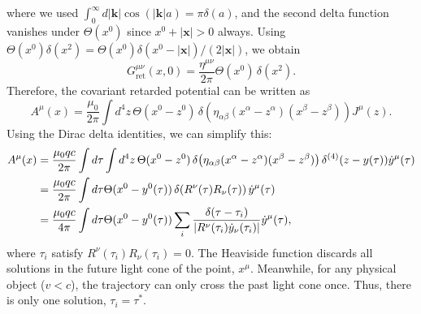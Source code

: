 where we used $\int_0^\infty d|\mathbf{k}|\cos(|\mathbf{k}|a) = \pi\delta(a)$, and the second delta function vanishes under $\Theta(x^0)$ since $x^0 + |\mathbf{x}| > 0$ always. Using $\Theta(x^0)\delta(x^2) = \Theta(x^0)\delta(x^0-|\mathbf{x}|)/(2|\mathbf{x}|)$, we obtain
\begin{equation}
    \boxed{G^{\mu\nu}_{\mathrm{ret}}(x,0) = \frac{\eta^{\mu\nu}}{2\pi}\Theta(x^0)\,\delta(x^2).}
\end{equation}
Therefore, the covariant retarded potential can be written as
\begin{equation}
    A^\mu(x) =\frac{\mu_0}{2\pi}\int d^4z\,
     \Theta(x^0-z^0)\,\delta\!\left(\eta_{\alpha\beta}
     (x^\alpha-z^\alpha)(x^\beta-z^\beta)\right)J^\mu(z).
\end{equation}
Using the Dirac delta identities, we can simplify this:
\begin{align}
        A^\mu(x) &= \frac{\mu_0qc}{2\pi}\int d\tau\int d^4z\,
     \Theta(x^0-z^0)\,\delta\!\left(\eta_{\alpha\beta}
     (x^\alpha-z^\alpha)(x^\beta-z^\beta)\right)\delta^{(4)}(z-y(\tau))\dot{y}^\mu(\tau) \notag \\
     &=\frac{\mu_0qc}{2\pi}\int d\tau
     \Theta(x^0-y^0(\tau))\,\delta\!\left(R^\nu(\tau)R_\nu(\tau)\right)\dot{y}^\mu(\tau) \notag\\
     &=\frac{\mu_0qc}{4\pi}\int d\tau
     \Theta(x^0-y^0(\tau))\sum_i\frac{\delta(\tau-\tau_i)}{|R^\nu(\tau_i)\dot{y}_\nu(\tau_i)|}\dot{y}^\mu(\tau),
\end{align}
where $\tau_i$ satisfy $R^\nu(\tau_i)R_\nu(\tau_i) = 0$. The Heaviside function discards all solutions in the future light cone of the point, $x^\mu$. Meanwhile, for any physical object ($v<c$), the trajectory can only cross the past light cone once. Thus, there is only one solution, $\tau_i = \tau^*$.

